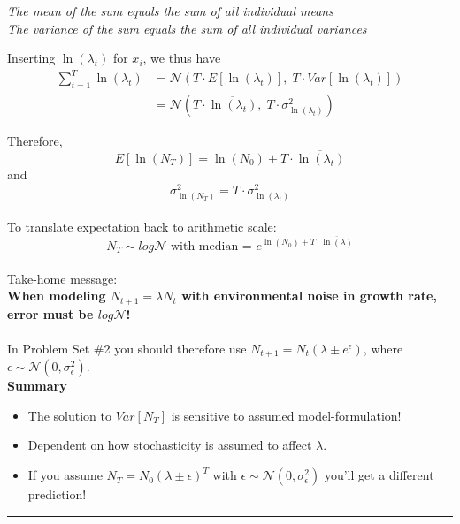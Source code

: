 \documentclass{article}
\begin{document}
\begin{center}
\emph{The mean of the sum equals the sum of all individual means}\\
\emph{The variance of the sum equals the sum of all individual variances}\\
\end{center}
Inserting $\ln (\lambda_t)$ for $x_i$, we thus have
\begin{align*}
	\sum_{t=1}^T \ln (\lambda_t) & =  \mathcal{N}(T\cdot E[\ln(\lambda_t)] , \; T\cdot Var[\ln(\lambda_t)])\\
	& = \mathcal{N}(T\cdot \overline{\ln(\lambda_t)},\; T\cdot\sigma_{\ln (\lambda_t)}^2)
\end{align*}

Therefore,
\begin{equation*}
	E[\ln(N_T)]=\ln(N_0)+ T \cdot \overline{\ln(\lambda_t)}
\end{equation*}
and
\begin{equation*}
\sigma_{\ln (N_T)}^2 = T\cdot \sigma_{\ln(\lambda_t)}^2
\end{equation*}
\\
To translate expectation back to arithmetic scale:
\begin{equation*}
	N_T \sim log\mathcal{N} \text{ with median = } e^{\ln(N_0)+T\cdot \overline{\ln(\lambda)}}
\end{equation*}
\\
Take-home message:\\
\textbf{When modeling $N_{t+1}=\lambda N_t$ with environmental noise in growth rate, error must be $log\mathcal{N}$!}\\
\\
In Problem Set \#2 you should therefore use $N_{t+1}=N_t (\lambda \pm e^\epsilon)$, where $\epsilon \sim \mathcal{N}(0,\sigma_\epsilon^2)$.\\

\textbf{Summary}
\begin{itemize}
\item The solution to $Var[N_T]$ is sensitive to assumed model-formulation!
\item Dependent on how stochasticity is assumed to affect $\lambda$.
\item If you assume $N_{T}=N_0 (\lambda \pm \epsilon)^T$ with $\epsilon \sim \mathcal{N}(0,\sigma_\epsilon^2)$ you'll get a different prediction!
\end{itemize}

\rule[0.5ex]{\linewidth}{1pt}
\pagebreak
\end{document}
